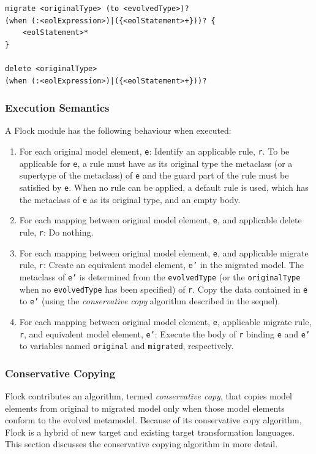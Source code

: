 \begin{lstlisting}[float=tbp, caption=Concrete syntax of migrate and delete rules., label=lst:flock_concrete_syntax, language=Flock]
migrate <originalType> (to <evolvedType>)?
(when (:<eolExpression>)|({<eolStatement>+}))? {
	<eolStatement>*
} 

delete <originalType>
(when (:<eolExpression>)|({<eolStatement>+}))?
\end{lstlisting}

\subsubsection{Execution Semantics}
A Flock module has the following behaviour when executed:

\begin{enumerate}
	\item For each original model element, \texttt{e}:
	\subitem Identify an applicable rule, \texttt{r}. To be applicable for \texttt{e}, a rule must have as its original type the metaclass (or a supertype of the metaclass) of \texttt{e} and the guard part of the rule must be satisfied by \texttt{e}.
	\subitem When no rule can be applied, a default rule is used, which has the metaclass of \texttt{e} as its original type, and an empty body.
	
	\item For each mapping between original model element, \texttt{e}, and applicable delete rule, \texttt{r}:
	\subitem Do nothing.
	
	\item For each mapping between original model element, \texttt{e}, and applicable migrate rule, \texttt{r}:
	\subitem Create an equivalent model element, \texttt{e'} in the migrated model. The metaclass of \texttt{e'} is determined from the \texttt{evolvedType} (or the \texttt{originalType} when no \texttt{evolvedType} has been specified) of \texttt{r}.
	\subitem Copy the data contained in \texttt{e} to \texttt{e'} (using the \emph{conservative copy} algorithm described in the sequel).

	\item For each mapping between original model element, \texttt{e}, applicable migrate rule, \texttt{r}, and equivalent model element, \texttt{e'}:
	\subitem Execute the body of \texttt{r} binding \texttt{e} and \texttt{e'} to variables named \texttt{original} and \texttt{migrated}, respectively.
\end{enumerate}


\subsubsection{Conservative Copying}
\label{subsubsec:conservative_copying}
Flock contributes an algorithm, termed \emph{conservative copy}, that copies model elements from original to migrated model only when those model elements conform to the evolved metamodel. Because of its conservative copy algorithm, Flock is a hybrid of new target and existing target transformation languages. This section discusses the conservative copying algorithm in more detail.

